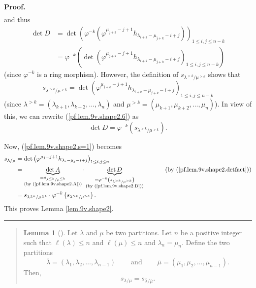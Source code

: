 \documentclass[numbers=enddot,12pt,final,onecolumn,notitlepage]{scrartcl}%
\newenvironment{statement}{\begin{quote}}{\end{quote}}
\theoremstyle{definition}
\newtheorem{lem}[theo]{Lemma}
\newenvironment{lemmain}[1][]
{\begin{statement}\begin{lem}[#1]}
{\end{lem}\end{statement}}
\newenvironment{proof}[1][Proof]{\noindent\textbf{#1.} }{\ \rule{0.5em}{0.5em}}
\newenvironment{lemmain}[1][Proof]{\noindent\textbf{#1.} }{\ \rule{0.5em}{0.5em}}
\begin{document}
\begin{enumerate}
\begin{proof}
\begin{align*}
\end{align*}
and thus%
\begin{align}
\det D  &  =\det\left(  \varphi^{-k}\left(  \varphi^{\mu_{j+k}-j+1}%
h_{\lambda_{i+k}-\mu_{j+k}-i+j}\right)  \right)  _{1\leq i,j\leq
n-k}\nonumber\\
&  =\varphi^{-k}\left(  \det\left(  \varphi^{\mu_{j+k}-j+1}h_{\lambda
_{i+k}-\mu_{j+k}-i+j}\right)  _{1\leq i,j\leq n-k}\right)
\label{pf.lem.9v.shape2.6}%
\end{align}
(since $\varphi^{-k}$ is a ring morphism). However, the definition of
$s_{\lambda^{>k}/\mu^{>k}}$ shows that%
\[
s_{\lambda^{>k}/\mu^{>k}}=\det\left(  \varphi^{\mu_{j+k}-j+1}h_{\lambda
_{i+k}-\mu_{j+k}-i+j}\right)  _{1\leq i,j\leq n-k}%
\]
(since $\lambda^{>k}=\left(  \lambda_{k+1},\lambda_{k+2},\ldots,\lambda
_{n}\right)  $ and $\mu^{>k}=\left(  \mu_{k+1},\mu_{k+2},\ldots,\mu
_{n}\right)  $). In view of this, we can rewrite (\ref{pf.lem.9v.shape2.6}) as%
\begin{equation}
\det D=\varphi^{-k}\left(  s_{\lambda^{>k}/\mu^{>k}}\right)  .
\label{pf.lem.9v.shape2.D}%
\end{equation}


Now, (\ref{pf.lem.9v.shape2.s=1}) becomes%
\begin{align*}
s_{\lambda/\mu}  &  =\det\left(  \varphi^{\mu_{j}-j+1}h_{\lambda_{i}-\mu
_{j}-i+j}\right)  _{1\leq i,j\leq n}\\
&  =\underbrace{\det A}_{\substack{=s_{\lambda^{\leq k}/\mu^{\leq k}%
}\\\text{(by (\ref{pf.lem.9v.shape2.A}))}}}\cdot\underbrace{\det
D}_{\substack{=\varphi^{-k}\left(  s_{\lambda^{>k}/\mu^{>k}}\right)
\\\text{(by (\ref{pf.lem.9v.shape2.D}))}}}\ \ \ \ \ \ \ \ \ \ \left(  \text{by
(\ref{pf.lem.9v.shape2.detfact})}\right) \\
&  =s_{\lambda^{\leq k}/\mu^{\leq k}}\cdot\varphi^{-k}\left(  s_{\lambda
^{>k}/\mu^{>k}}\right)  .
\end{align*}
This proves Lemma \ref{lem.9v.shape2}.
\end{proof}

\begin{lemmain}
\label{lem.9v.shape3}Let $\lambda$ and $\mu$ be two partitions. Let $n$ be a
positive integer such that $\ell\left(  \lambda\right)  \leq n$ and
$\ell\left(  \mu\right)  \leq n$ and $\lambda_{n}=\mu_{n}$. Define the two
partitions%
\[
\overline{\lambda}=\left(  \lambda_{1},\lambda_{2},\ldots,\lambda
_{n-1}\right)  \ \ \ \ \ \ \ \ \ \ \text{and}\ \ \ \ \ \ \ \ \ \ \overline
{\mu}=\left(  \mu_{1},\mu_{2},\ldots,\mu_{n-1}\right)  .
\]
Then,%
\[
s_{\lambda/\mu}=s_{\overline{\lambda}/\overline{\mu}}.
\]


\end{lemmain}
\end{enumerate}
\end{document}

